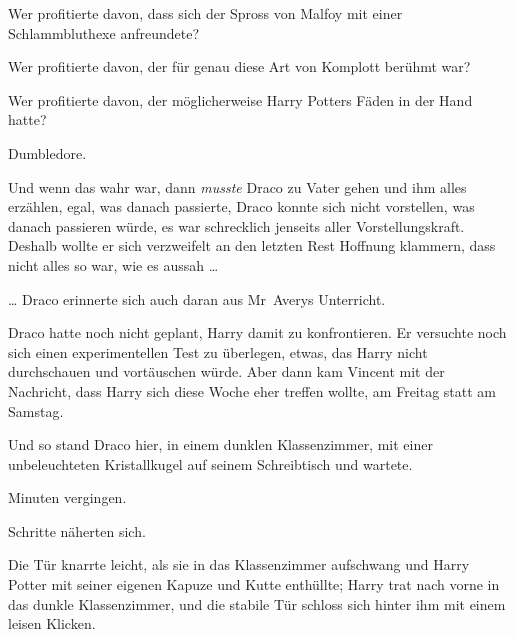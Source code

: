 Wer profitierte davon, dass sich der Spross von Malfoy mit einer Schlammbluthexe anfreundete?

Wer profitierte davon, der für genau diese Art von Komplott berühmt war?

Wer profitierte davon, der möglicherweise Harry Potters Fäden in der Hand hatte?

Dumbledore.

Und wenn das wahr war, dann \emph{musste} Draco zu Vater gehen und ihm alles erzählen, egal, was danach passierte, Draco konnte sich nicht vorstellen, was danach passieren würde, es war schrecklich jenseits aller Vorstellungskraft. Deshalb wollte er sich verzweifelt an den letzten Rest Hoffnung klammern, dass nicht alles so war, wie es aussah …

… Draco erinnerte sich auch daran aus Mr~Averys Unterricht.

Draco hatte noch nicht geplant, Harry damit zu konfrontieren. Er versuchte noch sich einen experimentellen Test zu überlegen, etwas, das Harry nicht durchschauen und vortäuschen würde. Aber dann kam Vincent mit der Nachricht, dass Harry sich diese Woche eher treffen wollte, am Freitag statt am Samstag.

Und so stand Draco hier, in einem dunklen Klassenzimmer, mit einer unbeleuchteten Kristallkugel auf seinem Schreibtisch und wartete.

Minuten vergingen.

Schritte näherten sich.

Die Tür knarrte leicht, als sie in das Klassenzimmer aufschwang und Harry Potter mit seiner eigenen Kapuze und Kutte enthüllte; Harry trat nach vorne in das dunkle Klassenzimmer, und die stabile Tür schloss sich hinter ihm mit einem leisen Klicken.

